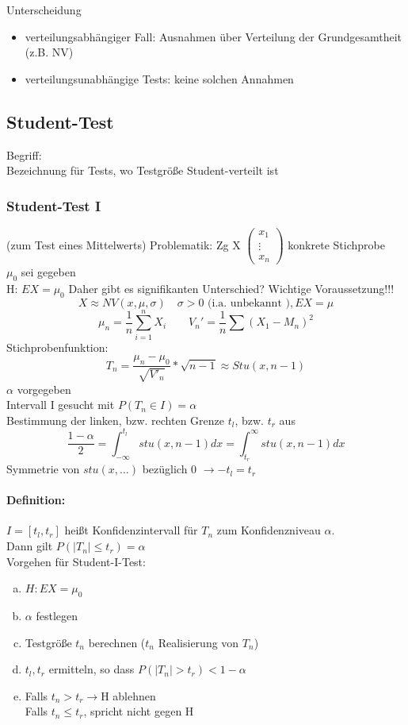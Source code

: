 \documentclass[a4paper,12pt]{scrartcl}
\begin{document}
 Unterscheidung
 \begin{itemize}
  \item verteilungsabhängiger Fall: Ausnahmen über Verteilung der Grundgesamtheit (z.B. NV)
  \item verteilungsunabhängige Tests: keine solchen Annahmen
 \end{itemize}
 
 \subsection{Student-Test}
 
 Begriff:\\
 Bezeichnung für Tests, wo Testgröße Student-verteilt ist
 \subsubsection{Student-Test I}
 (zum Test eines Mittelwerts)
 Problematik: Zg X $\begin{pmatrix}
                     x_1\\\vdots\\x_n
                    \end{pmatrix}$ konkrete Stichprobe\\
 $\mu_0$ sei gegeben\\                   
                    
 H: $EX=\mu_0$   Daher gibt es signifikanten Unterschied?
 Wichtige Voraussetzung!!!\\
 $$X\approx NV(x,\mu,\sigma)\quad\sigma>0\text{ (i.a. unbekannt )},EX=\mu$$
 $$\mu_n=\frac{1}{n}\sum_{i=1}^n X_i\quad\quad V_n'=\frac{1}{n}\sum(X_1-M_n)^2$$
 Stichprobenfunktion:
 $$T_n = \frac{\mu_n-\mu_0}{\sqrt{V'_n}}*\sqrt{n-1}\approx Stu(x,n-1)$$
 $\alpha$ vorgegeben\\
 Intervall I gesucht mit $P(T_n\in I)=\alpha$\\
 
 
 Bestimmung der linken, bzw. rechten Grenze $t_l$, bzw. $t_r$ aus
 $$\frac{1-\alpha}{2}=\int_{-\infty}^{t_l}stu(x,n-1) dx = \int^\infty_{t_r} stu(x,n-1) dx$$
 Symmetrie von $stu(x,\dots)$ bezüglich 0 $\to-t_l=t_r$\\
 \paragraph{Definition:} $I=[t_l,t_r]$ heißt Konfidenzintervall für $T_n$ zum Konfidenzniveau $\alpha$.\\
 Dann gilt $P(|T_n|\leq t_r) = \alpha$\\
 Vorgehen für Student-I-Test:
 \begin{enumerate}[(a)]
  \item $H: EX= \mu_0$
  \item $\alpha$ festlegen
  \item Testgröße $t_n$ berechnen ($t_n$ Realisierung von $T_n$)
  \item $t_l,t_r$ ermitteln, so dass $P(|T_n|>t_r)<1-\alpha$
  \item Falls $t_n>t_r\to$H ablehnen\\
	Falls $t_n\leq t_r$, spricht nicht gegen H
 \end{enumerate}
\end{document}
